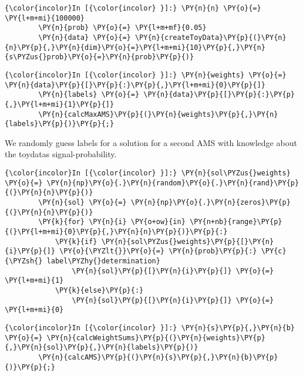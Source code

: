     \begin{Verbatim}[commandchars=\\\{\}]
{\color{incolor}In [{\color{incolor} }]:} \PY{n}{n} \PY{o}{=} \PY{l+m+mi}{100000}
        \PY{n}{prob} \PY{o}{=} \PY{l+m+mf}{0.05}
        \PY{n}{data} \PY{o}{=} \PY{n}{createToyData}\PY{p}{(}\PY{n}{n}\PY{p}{,}\PY{n}{dim}\PY{o}{=}\PY{l+m+mi}{10}\PY{p}{,}\PY{n}{s\PYZus{}prob}\PY{o}{=}\PY{n}{prob}\PY{p}{)}
\end{Verbatim}

    \begin{Verbatim}[commandchars=\\\{\}]
{\color{incolor}In [{\color{incolor} }]:} \PY{n}{weights} \PY{o}{=} \PY{n}{data}\PY{p}{[}\PY{p}{:}\PY{p}{,}\PY{l+m+mi}{0}\PY{p}{]}
        \PY{n}{labels} \PY{o}{=} \PY{n}{data}\PY{p}{[}\PY{p}{:}\PY{p}{,}\PY{l+m+mi}{1}\PY{p}{]}
        \PY{n}{calcMaxAMS}\PY{p}{(}\PY{n}{weights}\PY{p}{,}\PY{n}{labels}\PY{p}{)}\PY{p}{;}
\end{Verbatim}

    We randomly guess labels for a solution for a second AMS with knowledge
about the toydatas signal-probability.

    \begin{Verbatim}[commandchars=\\\{\}]
{\color{incolor}In [{\color{incolor} }]:} \PY{n}{sol\PYZus{}weights} \PY{o}{=} \PY{n}{np}\PY{o}{.}\PY{n}{random}\PY{o}{.}\PY{n}{rand}\PY{p}{(}\PY{n}{n}\PY{p}{)}
        \PY{n}{sol} \PY{o}{=} \PY{n}{np}\PY{o}{.}\PY{n}{zeros}\PY{p}{(}\PY{n}{n}\PY{p}{)}
        \PY{k}{for} \PY{n}{i} \PY{o+ow}{in} \PY{n+nb}{range}\PY{p}{(}\PY{l+m+mi}{0}\PY{p}{,}\PY{n}{n}\PY{p}{)}\PY{p}{:}
            \PY{k}{if} \PY{n}{sol\PYZus{}weights}\PY{p}{[}\PY{n}{i}\PY{p}{]} \PY{o}{\PYZlt{}}\PY{o}{=} \PY{n}{prob}\PY{p}{:} \PY{c}{\PYZsh{} label\PYZhy{}determination}
                \PY{n}{sol}\PY{p}{[}\PY{n}{i}\PY{p}{]} \PY{o}{=} \PY{l+m+mi}{1}
            \PY{k}{else}\PY{p}{:}
                \PY{n}{sol}\PY{p}{[}\PY{n}{i}\PY{p}{]} \PY{o}{=} \PY{l+m+mi}{0}
\end{Verbatim}

    \begin{Verbatim}[commandchars=\\\{\}]
{\color{incolor}In [{\color{incolor} }]:} \PY{n}{s}\PY{p}{,}\PY{n}{b} \PY{o}{=} \PY{n}{calcWeightSums}\PY{p}{(}\PY{n}{weights}\PY{p}{,}\PY{n}{sol}\PY{p}{,}\PY{n}{labels}\PY{p}{)}
        \PY{n}{calcAMS}\PY{p}{(}\PY{n}{s}\PY{p}{,}\PY{n}{b}\PY{p}{)}\PY{p}{;}
\end{Verbatim}